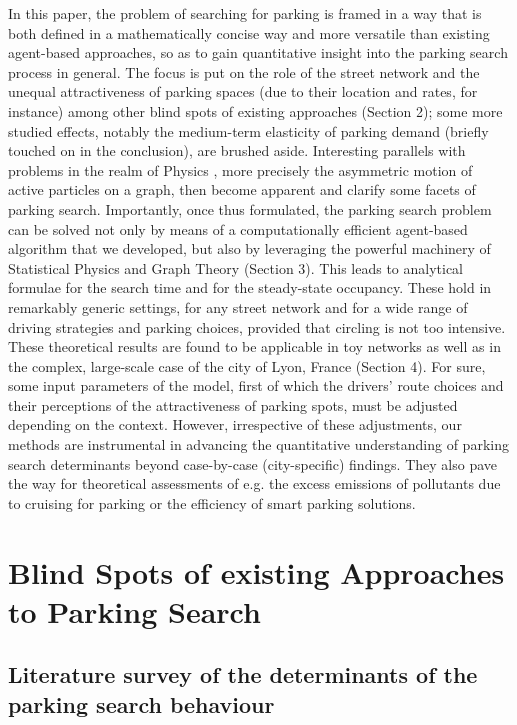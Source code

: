 \documentclass[trsc,reprint]{informs3}
\newcommand{\AN}[1]{#1}
\begin{document}
In this paper, the problem \AN{of searching for parking} is framed in a way that is both
\AN{defined in a mathematically concise way} and more versatile than existing agent-based approaches,
\AN{so as to gain quantitative insight into the parking search process in general.} The focus is put on the role of the street network and the unequal attractiveness of parking spaces (due to their location and rates, for instance) among other blind spots of existing approaches (Section 2); some more studied effects, notably the medium-term elasticity of parking demand \AN{(briefly touched on in the conclusion)}, 
are brushed aside. Interesting parallels with problems in the realm of Physics \citep{schadschneider2010stochastic}, more precisely the asymmetric motion of active particles on a graph, then become apparent and clarify some facets of parking search. Importantly, once thus formulated, the parking \AN{search} problem can be solved not only by means of a computationally efficient agent-based algorithm that we developed, but also
by leveraging the powerful machinery of Statistical Physics and Graph Theory  (Section 3).
This leads to analytical formulae for the search time and for the steady-state occupancy. 
\AN{These hold} in remarkably generic settings, for any street network and for a wide range of driving strategies and parking
choices,
\AN{provided that circling is not too intensive.}
These theoretical results are found to be applicable in toy networks as well
as in the complex, large-scale case of the city of Lyon, France (Section 4).
\AN{For sure, some input parameters of the model, first of which 
the drivers' route choices and their perceptions of the attractiveness of parking spots, must be adjusted depending on the context. However, irrespective of these adjustments, our methods are instrumental in advancing the quantitative understanding of parking search determinants beyond case-by-case (city-specific) findings. They also} 
pave the
way for theoretical assessments of e.g. the excess emissions of pollutants due to cruising for parking or the efficiency of smart parking solutions.



\section{Blind Spots of existing Approaches to Parking Search}

\subsection{Literature survey of the determinants of the parking search behaviour}
\end{document}
